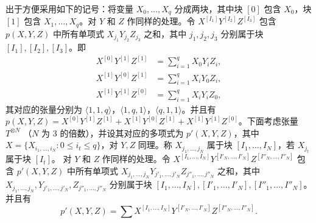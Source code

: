 \documentclass[11pt,fleqn, UTF8]{ctexbook} %
\begin{document}
出于方便采用如下的记号：将变量 $X_0,\dots,X_q$ 分成两块，其中块 $[0]$ 包含 $X_0$，块 $[1]$ 包含 $X_1,\dots,X_q$。对 $Y$ 和 $Z$ 作同样的处理。令 $X^{[I_1]}Y^{[I_2]}Z^{[I_3]}$ 包含 $p(X,Y,Z)$ 中所有单项式 $X_{j_1}Y_{j_2}Z_{j_3}$ 之和，其中 $j_1,j_2,j_3$ 分别属于块 $[I_1],[I_2],[I_3]$。即
\begin{align}
X^{[0]}Y^{[1]}Z^{[1]}&=\sum_{i=1}^q X_0Y_iZ_i,\\
X^{[1]}Y^{[0]}Z^{[1]}&=\sum_{i=1}^q X_iY_0Z_i,\\
X^{[1]}Y^{[1]}Z^{[0]}&=\sum_{i=1}^q X_iY_iZ_0,
\end{align}
其对应的张量分别为 $\langle 1,1,q\rangle$，$\langle 1,q,1\rangle$，$\langle q,1,1\rangle$。并且有 $p(X,Y,Z)=X^{[0]}Y^{[1]}Z^{[1]}+X^{[1]}Y^{[0]}Z^{[1]}+X^{[1]}Y^{[1]}Z^{[0]}$。下面考虑张量 $T^{\otimes N}$ （$N$ 为 $3$ 的倍数），并设其对应的多项式为 $p'(X,Y,Z)$，其中 $X=\{X_{i_1,\dots,i_N}: 0\leq i_t\leq q\}$，对 $Y,Z$ 同理。称 $X_{j_1,\dots,j_N}$ 属于块 $[I_1,\dots,I_N]$，若 $X_{j_t}$ 属于块 $[I_t]$。 对 $Y$ 和 $Z$ 作同样的处理。令 $X^{[I_1,\dots,I_N]}Y^{[I'_N,\dots,I'_N]}Z^{[I''_N,\dots,I''_N]}$ 包含 $p'(X,Y,Z)$ 中所有单项式 $X_{j_1,\dots,j_N}Y_{j'_1,\dots,j'_N}Z_{j''_1,\dots,j''_N}$ 之和，其中 $X_{j_1,\dots,j_N},Y_{j'_1,\dots,j'_N},Z_{j''_1,\dots,j''_N}$ 分别属于块 $[I_1,\dots,I_N],[I'_1,\dots,I'_N],[I''_1,\dots,I''_N]$。并且有
$$
p'(X,Y,Z)=\sum X^{[I_1,\dots,I_N]}Y^{[I'_N,\dots,I'_N]}Z^{[I''_N,\dots,I''_N]}.
$$
\end{document}
